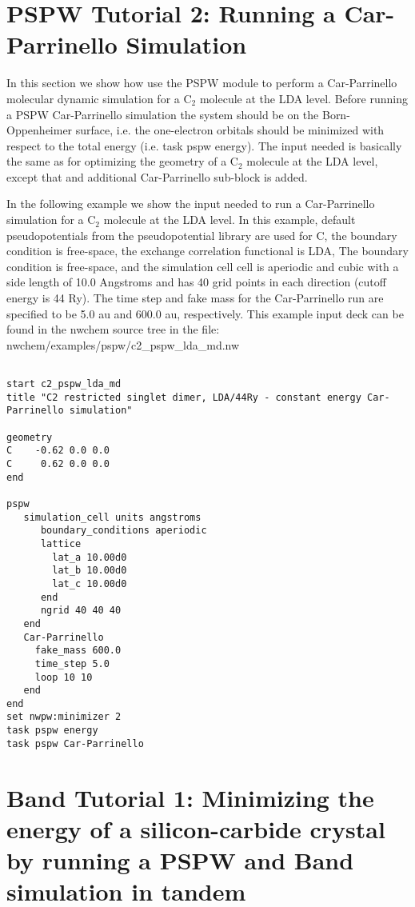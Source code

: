 \normalsize
\section{PSPW Tutorial 2: Running a Car-Parrinello Simulation}
\label{sec:pspw_cp}
\normalsize

In this section we show how use the PSPW module to perform a Car-Parrinello
molecular dynamic simulation for a C$_2$ molecule at the LDA level.  
Before running a PSPW Car-Parrinello  simulation the system should be
on the Born-Oppenheimer surface, i.e. the one-electron orbitals should be minimized 
with respect to the total energy (i.e. task pspw energy).  The input needed
is basically the same as for optimizing the geometry of a C$_2$ molecule at the LDA level,
except that and additional Car-Parrinello sub-block is added.  

In the following example we show the input needed to run a Car-Parrinello simulation
for a C$_2$ molecule at the LDA level.  In this example, default pseudopotentials
from the pseudopotential library are used for C, the boundary condition is free-space, 
the exchange correlation functional is LDA, The boundary condition is free-space, and 
the simulation cell cell is aperiodic and cubic with a side length of 10.0 Angstroms and has
40 grid points in each direction (cutoff energy is 44 Ry).  The time step and fake mass
for the Car-Parrinello run are specified to be 5.0 au and 600.0 au, respectively.  
This example input deck can be found in the nwchem source tree in the file: nwchem/examples/pspw/c2\_pspw\_lda\_md.nw

\begin{verbatim}
         
start c2_pspw_lda_md
title "C2 restricted singlet dimer, LDA/44Ry - constant energy Car-Parrinello simulation"

geometry  
C    -0.62 0.0 0.0
C     0.62 0.0 0.0
end
       
pspw
   simulation_cell units angstroms
      boundary_conditions aperiodic
      lattice
        lat_a 10.00d0
        lat_b 10.00d0
        lat_c 10.00d0
      end
      ngrid 40 40 40
   end
   Car-Parrinello
     fake_mass 600.0
     time_step 5.0
     loop 10 10
   end
end
set nwpw:minimizer 2
task pspw energy
task pspw Car-Parrinello
\end{verbatim}



\normalsize
\section{Band Tutorial 1: Minimizing the energy of a silicon-carbide crystal by running a PSPW and Band simulation in tandem}
\label{sec:band_tutorial1}
\normalsize
 
